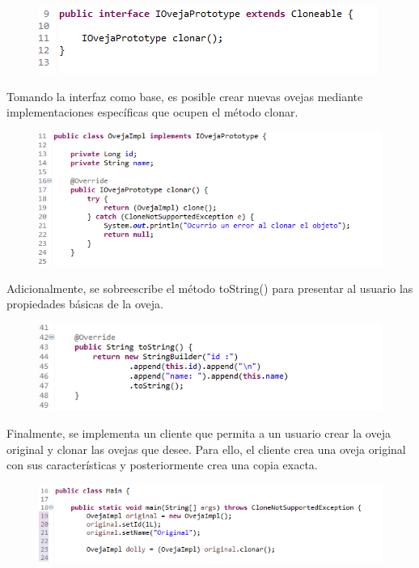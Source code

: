 \begin{figure}[H]
	\includegraphics{images/creational/prototipe/prorotypeExample1.png}
\end{figure}

Tomando la interfaz como base, es posible crear nuevas ovejas mediante implementaciones específicas que ocupen el método clonar.

\begin{figure}[H]
	\includegraphics{images/creational/prototipe/prorotypeExample2.png}
\end{figure}

Adicionalmente, se sobreescribe el método toString() para presentar al usuario las propiedades básicas de la oveja.

\begin{figure}[H]
	\includegraphics{images/creational/prototipe/prorotypeExample3.png}
\end{figure}

Finalmente, se implementa un cliente que permita a un usuario crear la oveja original y clonar las ovejas que desee. Para ello, el cliente crea una oveja original con sus características y posteriormente crea una copia exacta.

\begin{figure}[H]
	\includegraphics{images/creational/prototipe/prorotypeExample4.png}
\end{figure}

